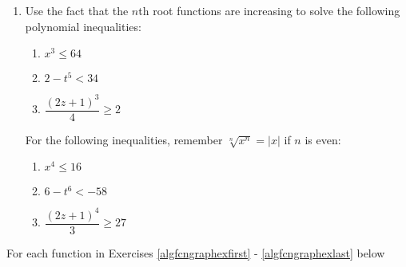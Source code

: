 \begin{enumerate}
\setcounter{enumi}{\value{HW}}



\item  \label{rootstosolvepolyineq} Use the fact that the $n$th root functions are increasing to solve the following polynomial inequalities:

\begin{multicols}{3}

\begin{enumerate}

\item  $x^3 \leq 64$    %

\item  $2 - t^5 <  34$    %

\item $\dfrac{(2z+1)^3}{4} \geq 2$ %

\setcounter{HWindent}{\value{enumii}}

\end{enumerate}
\end{multicols}

For the following inequalities, remember $\sqrt[n]{x^{n}} = |x|$ if $n$ is even:

\begin{multicols}{3}

\begin{enumerate}
\setcounter{enumii}{\value{HWindent}}

\item  $x^4 \leq 16$    %

\item  $6-t^6 < -58$    %

\item $\dfrac{(2z+1)^4}{3} \geq 27$ %

\end{enumerate}

\end{multicols}

\setcounter{HW}{\value{enumi}}
\end{enumerate}


For each function in Exercises \ref{algfcngraphexfirst} - \ref{algfcngraphexlast} below 

